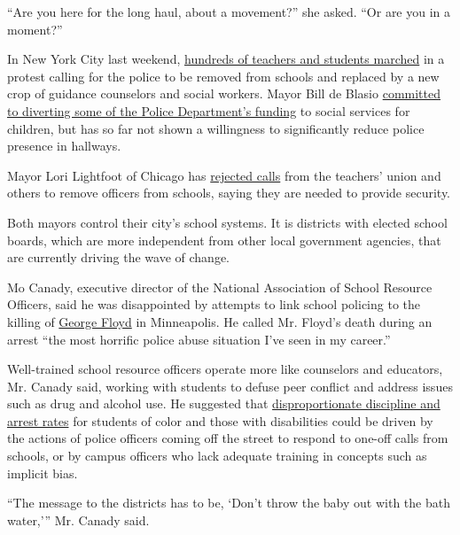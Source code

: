 ``Are you here for the long haul, about a movement?'' she asked. ``Or
are you in a moment?''

In New York City last weekend,
\href{https://twitter.com/madinatoure/status/1269278624009551874}{hundreds
of teachers and students marched} in a protest calling for the police to
be removed from schools and replaced by a new crop of guidance
counselors and social workers. Mayor Bill de Blasio
\href{https://www.nytimes.com/2020/06/07/nyregion/deblasio-nypd-funding.html}{committed
to diverting some of the Police Department's funding} to social services
for children, but has so far not shown a willingness to significantly
reduce police presence in hallways.

Mayor Lori Lightfoot of Chicago has
\href{https://news.wttw.com/2020/06/05/lightfoot-rules-out-removing-police-officers-chicago-schools\#:~:text=Mayor\%20Lori\%20Lightfoot\%20will\%20not,can\%20negatively\%20impact\%20their\%20learning.}{rejected
calls} from the teachers' union and others to remove officers from
schools, saying they are needed to provide security.

Both mayors control their city's school systems. It is districts with
elected school boards, which are more independent from other local
government agencies, that are currently driving the wave of change.

Mo Canady, executive director of the National Association of School
Resource Officers, said he was disappointed by attempts to link school
policing to the killing of
\href{https://www.nytimes.com/article/george-floyd-who-is.html}{George
Floyd} in Minneapolis. He called Mr. Floyd's death during an arrest
``the most horrific police abuse situation I've seen in my career.''

Well-trained school resource officers operate more like counselors and
educators, Mr. Canady said, working with students to defuse peer
conflict and address issues such as drug and alcohol use. He suggested
that
\href{http://www.justicepolicy.org/uploads/justicepolicy/documents/educationunderarrest_fullreport.pdf}{disproportionate
discipline and arrest rates} for students of color and those with
disabilities could be driven by the actions of police officers coming
off the street to respond to one-off calls from schools, or by campus
officers who lack adequate training in concepts such as implicit bias.

``The message to the districts has to be, `Don't throw the baby out with
the bath water,''' Mr. Canady said.

